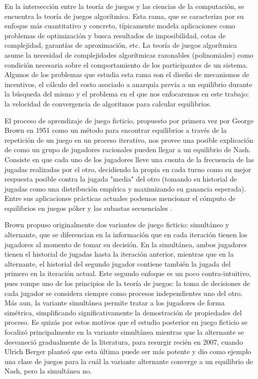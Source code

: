 En la intersección entre la teoría de juegos y las ciencias de la computación, se encuentra la teoría de juegos algorítmica. Esta rama, que se caracteriza por su enfoque más cuantitativo y concreto, típicamente modela aplicaciones como problemas de optimización y busca resultados de imposibilidad, cotas de complejidad, garantías de aproximación, etc. La teoría de juegos algorítmica asume la necesidad de complejidades algorítmicas razonables (polinomiales) como condición necesaria sobre el comportamiento de los participantes de un sistema. Algunos de los problemas que estudia esta rama son el diseño de mecanismos de incentivos, el cálculo del costo asociado a anarquía previa a un equilibrio durante la búsqueda del mismo y el problema en el que nos enfocaremos en este trabajo: la velocidad de convergencia de algoritmos para calcular equilibrios.

El proceso de aprendizaje de juego ficticio, propuesto por primera vez por George Brown en 1951 \cite{brown:1951} como un método para encontrar equilibrios a través de la repetición de un juego en un proceso iterativo, nos provee una posible explicación de como un grupo de jugadores racionales pueden llegar a un equilibrio de Nash. Consiste en que cada uno de los jugadores lleve una cuenta de la frecuencia de las jugadas realizadas por el otro, decidiendo la propia en cada turno como su mejor respuesta posible contra la jugada "media" del otro (tomando su historial de jugadas como una distribución empírica y maximizando su ganancia esperada). Entre sus aplicaciones prácticas actuales podemos mencionar el cómputo de equilibrios en juegos póker \cite{casos:uso:poker} y las subastas secuenciales \cite{casos:uso:subastas:secuenciales}.

Brown propuso originalmente dos variantes de juego ficticio: simultáneo y alternante, que se diferencian en la información que en cada iteración tienen los jugadores al momento de tomar su decisión. En la simultánea, ambos jugadores tienen el historial de jugadas hasta la iteración anterior, mientras que en la alternante, el historial del segundo jugador contiene también la jugada del primero en la iteración actual. Este segundo enfoque es un poco contra-intuitivo, pues rompe uno de los principios de la teoría de juegos: la toma de decisiones de cada jugador se considera siempre como procesos independientes uno del otro. Más aun, la variante simultánea permite tratar a los jugadores de forma simétrica, simplificando significativamente la demostración de propiedades del proceso. Es quizás por estos motivos que el estudio posterior en juego ficticio se focalizó principalmente en la variante simultánea mientras que la alternante se desvaneció gradualmente de la literatura, para resurgir recién en 2007, cuando Ulrich Berger \cite{browns:original} planteó que  esta última puede ser más potente y dio como ejemplo una clase de juegos para la cuál la variante alternante converge a un equilibrio de Nash, pero la simultánea no.

